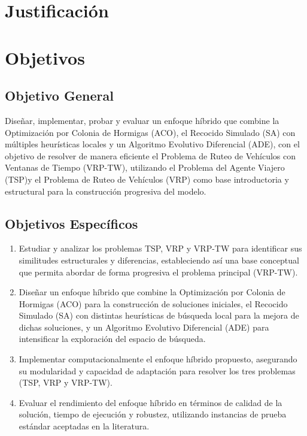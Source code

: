 \documentclass[12pt,titlepage,twoside,openright]{book}
\begin{document}
\section{Justificación}

\section{Objetivos}
\subsection{Objetivo General}

Diseñar, implementar, probar y evaluar un enfoque híbrido que combine la Optimización por Colonia de Hormigas (ACO), el Recocido Simulado (SA) con múltiples heurísticas locales y un Algoritmo Evolutivo Diferencial (ADE), con el objetivo de resolver de manera eficiente el Problema de Ruteo de Vehículos con Ventanas de Tiempo (VRP-TW), utilizando el Problema del Agente Viajero (TSP)y el Problema de Ruteo de Vehículos (VRP) como base introductoria y estructural para la construcción progresiva del modelo.
\subsection{Objetivos Específicos}

\begin{enumerate}
	\item Estudiar y analizar los problemas TSP, VRP y VRP-TW para identificar sus similitudes estructurales y diferencias, estableciendo así una base conceptual que permita abordar de forma progresiva el problema principal (VRP-TW).

	\item Diseñar un enfoque híbrido que combine la Optimización por Colonia de Hormigas (ACO) para la construcción de soluciones iniciales, el Recocido Simulado (SA) con distintas heurísticas de búsqueda local para la mejora de dichas soluciones, y un Algoritmo Evolutivo Diferencial (ADE) para intensificar la exploración del espacio de búsqueda.

	\item Implementar computacionalmente el enfoque híbrido propuesto, asegurando su modularidad y capacidad de adaptación para resolver los tres problemas (TSP, VRP y VRP-TW).

	\item Evaluar el rendimiento del enfoque híbrido en términos de calidad de la solución, tiempo de ejecución y robustez, utilizando instancias de prueba estándar aceptadas en la literatura.

\end{enumerate}
\end{document}
